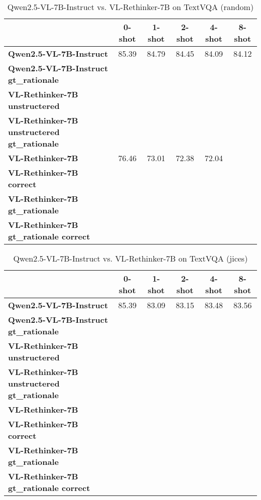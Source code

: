 \begin{table}
\caption{Qwen2.5-VL-7B-Instruct vs. VL-Rethinker-7B on TextVQA (random)}
\label{tab:Qwen2.5-VL-7B-Instruct_TextVQA_TRAIN_random}
\begin{tabular}{lccccc}
\toprule
 & 0-shot & 1-shot & 2-shot & 4-shot & 8-shot \\
\midrule
\textbf{Qwen2.5-VL-7B-Instruct} & 85.39 & 84.79 & 84.45 & 84.09 & 84.12 \\
\textbf{Qwen2.5-VL-7B-Instruct gt\_rationale} &  &  &  &  &  \\
\textbf{VL-Rethinker-7B unstructered} &  &  &  &  &  \\
\textbf{VL-Rethinker-7B unstructered gt\_rationale} &  &  &  &  &  \\
\textbf{VL-Rethinker-7B} & 76.46 & 73.01 & 72.38 & 72.04 &  \\
\textbf{VL-Rethinker-7B correct} &  &  &  &  &  \\
\textbf{VL-Rethinker-7B gt\_rationale} &  &  &  &  &  \\
\textbf{VL-Rethinker-7B gt\_rationale correct} &  &  &  &  &  \\
\bottomrule
\end{tabular}
\end{table}


\begin{table}
\caption{Qwen2.5-VL-7B-Instruct vs. VL-Rethinker-7B on TextVQA (jices)}
\label{tab:Qwen2.5-VL-7B-Instruct_TextVQA_TRAIN_jices}
\begin{tabular}{lccccc}
\toprule
 & 0-shot & 1-shot & 2-shot & 4-shot & 8-shot \\
\midrule
\textbf{Qwen2.5-VL-7B-Instruct} & 85.39 & 83.09 & 83.15 & 83.48 & 83.56 \\
\textbf{Qwen2.5-VL-7B-Instruct gt\_rationale} &  &  &  &  &  \\
\textbf{VL-Rethinker-7B unstructered} &  &  &  &  &  \\
\textbf{VL-Rethinker-7B unstructered gt\_rationale} &  &  &  &  &  \\
\textbf{VL-Rethinker-7B} &  &  &  &  &  \\
\textbf{VL-Rethinker-7B correct} &  &  &  &  &  \\
\textbf{VL-Rethinker-7B gt\_rationale} &  &  &  &  &  \\
\textbf{VL-Rethinker-7B gt\_rationale correct} &  &  &  &  &  \\
\bottomrule
\end{tabular}
\end{table}



